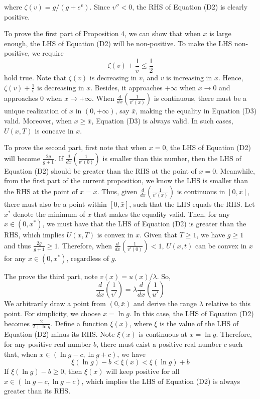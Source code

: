 where \(\zeta(v)=g/(g+e^v)\). Since \(v''<0\), the RHS of Equation (D2)
is clearly positive.

To prove the first part of Proposition 4, we can show that when \(x\) is
large enough, the LHS of Equation (D2) will be non-positive. To make the
LHS non-positive, we require\[\tag{D3}
\zeta(v)+\frac{1}{v}\leq\frac{1}{2}
\]hold true. Note that \(\zeta(v)\) is decreasing in \(v\), and \(v\) is
increasing in \(x\). Hence, \(\zeta(v)+\frac{1}{v}\) is decreasing in
\(x\). Besides, it approaches \(+\infty\) when \(x\rightarrow0\) and
approaches 0 when \(x\rightarrow +\infty\). When
\(\frac{d}{dx}\left(\frac{1}{v'(x)}\right)\) is continuous, there must
be a unique realization of \(x\) in \((0,+\infty)\), say \(\bar{x}\),
making the equality in Equation (D3) valid. Moreover, when
\(x\geq\bar{x}\), Equation (D3) is always valid. In such cases,
\(U(x,T)\) is concave in \(x\).

To prove the second part, first note that when \(x=0\), the LHS of
Equation (D2) will become \(\frac{2g}{g+1}\). If
\(\frac{d}{dx}\left(\frac{1}{v'(0)}\right)\) is smaller than this
number, then the LHS of Equation (D2) should be greater than the RHS at
the point of \(x=0\). Meanwhile, from the first part of the current
proposition, we know the LHS is smaller than the RHS at the point of
\(x=\bar{x}\). Thus, given \(\frac{d}{dx}\left(\frac{1}{v'(x)}\right)\)
is continuous in \([0,\bar{x}]\), there must also be a point within
\([0,\bar{x}]\), such that the LHS equals the RHS. Let \(x^*\) denote
the minimum of \(x\) that makes the equality valid. Then, for any
\(x\in(0,x^*)\), we must have that the LHS of Equation (D2) is greater
than the RHS, which implies \(U(x,T)\) is convex in \(x\). Given that
\(T\geq1\), we have \(g\geq1\) and thus \(\frac{2g}{g+1}\geq 1\).
Therefore, when \(\frac{d}{dx}\left(\frac{1}{v'(0)}\right)<1\),
\(U(x,t)\) can be convex in \(x\) for any \(x\in(0,x^{*})\), regardless
of \(g\).

The prove the third part, note \(v(x)=u(x)/\lambda\). So, \[
\frac{d}{dx}\left(\frac{1}{v'}\right)=\lambda\frac{d}{dx}\left(\frac{1}{u'}\right)
\]We arbitrarily draw a point from \((0,\bar{x})\) and derive the range
\(\lambda\) relative to this point. For simplicity, we choose
\(x=\ln g\). In this case, the LHS of Equation (D2) becomes
\(\frac{2}{2+\ln g}\). Define a function \(\xi(x)\), where \(\xi\) is
the value of the LHS of Equation (D2) minus its RHS. Note \(\xi(x)\) is
continuous at \(x=\ln g\). Therefore, for any positive real number
\(b\), there must exist a positive real number \(c\) such that, when
\(x\in(\ln g-c,\ln g+c)\), we have\[\tag{D4}
\xi(\ln g)-b<\xi(x)<\xi(\ln g)+b
\]If \(\xi(\ln g)-b\geq 0\), then \(\xi(x)\) will keep positive for all
\(x\in(\ln g-c,\ln g+c)\), which implies the LHS of Equation (D2) is
always greater than its RHS.

